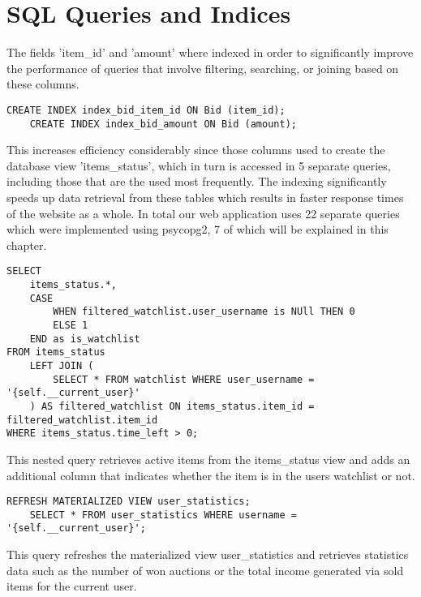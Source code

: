 
\chapter{SQL Queries and Indices}
The fields 'item\_id' and 'amount' where indexed in order to significantly improve the performance of queries that involve filtering, searching, or joining based on these columns. 

\begin{lstlisting}[style=sqlStyle]
	CREATE INDEX index_bid_item_id ON Bid (item_id);
	CREATE INDEX index_bid_amount ON Bid (amount);
\end{lstlisting}

This increases efficiency considerably since those columns used to create the database view 'items\_status', which in turn is accessed in 5 separate queries, including those that are the used most frequently. The indexing significantly speeds up data retrieval from these tables which results in faster response times of the website as a whole. In total our web application uses 22 separate queries which were implemented using psycopg2, 7 of which will be explained in this chapter.

\begin{lstlisting}[style=sqlStyle]
SELECT 
	items_status.*,
	CASE
		WHEN filtered_watchlist.user_username is NUll THEN 0
		ELSE 1
	END as is_watchlist
FROM items_status 
	LEFT JOIN (
		SELECT * FROM watchlist WHERE user_username = '{self.__current_user}'
	) AS filtered_watchlist ON items_status.item_id = filtered_watchlist.item_id 
WHERE items_status.time_left > 0;
\end{lstlisting}

This nested query retrieves active items from the items\_status view and adds an additional column that indicates whether the item is in the users watchlist or not.

\begin{lstlisting}[style=sqlStyle]
	REFRESH MATERIALIZED VIEW user_statistics;
	SELECT * FROM user_statistics WHERE username = '{self.__current_user}';
\end{lstlisting}
This query refreshes the materialized view user\_statistics and retrieves statistics data such as the number of won auctions or the total income generated via sold items for the current user.


